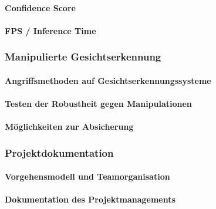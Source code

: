 \paragraph{Confidence Score}
\paragraph{FPS / Inference Time}

\subsubsection{Manipulierte Gesichtserkennung}
\paragraph{Angriffsmethoden auf Gesichtserkennungssysteme}
\paragraph{Testen der Robustheit gegen Manipulationen}
\paragraph{Möglichkeiten zur Absicherung}

\subsubsection{Projektdokumentation}
\paragraph{Vorgehensmodell und Teamorganisation}
\paragraph{Dokumentation des Projektmanagements}